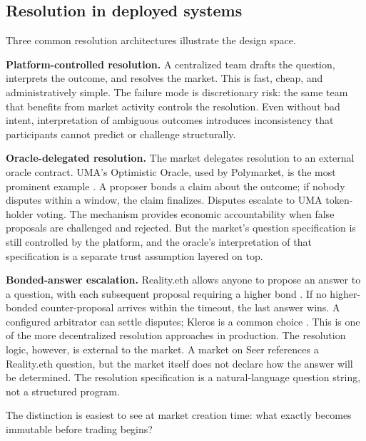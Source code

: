 \documentclass[10pt]{article}
\begin{document}
\subsection{Resolution in deployed systems}

Three common resolution architectures illustrate the design space.

\textbf{Platform-controlled resolution.} A centralized team drafts the question, interprets the outcome, and resolves the market. This is fast, cheap, and administratively simple. The failure mode is discretionary risk: the same team that benefits from market activity controls the resolution. Even without bad intent, interpretation of ambiguous outcomes introduces inconsistency that participants cannot predict or challenge structurally.

\textbf{Oracle-delegated resolution.} The market delegates resolution to an external oracle contract. UMA's Optimistic Oracle, used by Polymarket, is the most prominent example \cite{uma2021}. A proposer bonds a claim about the outcome; if nobody disputes within a window, the claim finalizes. Disputes escalate to UMA token-holder voting. The mechanism provides economic accountability when false proposals are challenged and rejected. But the market's question specification is still controlled by the platform, and the oracle's interpretation of that specification is a separate trust assumption layered on top.

\textbf{Bonded-answer escalation.} Reality.eth allows anyone to propose an answer to a question, with each subsequent proposal requiring a higher bond \cite{realityeth}. If no higher-bonded counter-proposal arrives within the timeout, the last answer wins. A configured arbitrator can settle disputes; Kleros is a common choice \cite{kleros2019}. This is one of the more decentralized resolution approaches in production. The resolution logic, however, is external to the market. A market on Seer references a Reality.eth question, but the market itself does not declare how the answer will be determined. The resolution specification is a natural-language question string, not a structured program.

The distinction is easiest to see at market creation time: what exactly becomes immutable before trading begins?
\end{document}
